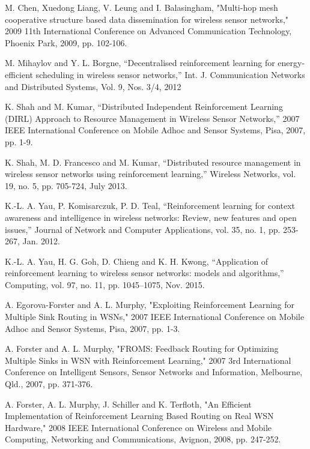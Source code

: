 \documentclass[journal]{IEEEtran}
\begin{document}
\begin{thebibliography}{1}
M. Chen, Xuedong Liang, V. Leung and I. Balasingham, "Multi-hop mesh cooperative structure based data dissemination for wireless sensor networks," 2009 11th International Conference on Advanced Communication Technology, Phoenix Park, 2009, pp. 102-106.

M. Mihaylov and Y. L. Borgne, ``Decentralised reinforcement learning for energy-efficient scheduling in wireless sensor networks,'' Int. J. Communication Networks and Distributed Systems, Vol. 9, Nos. 3/4, 2012

K. Shah and M. Kumar, ``Distributed Independent Reinforcement Learning (DIRL) Approach to Resource Management in Wireless Sensor Networks,'' 2007 IEEE International Conference on Mobile Adhoc and Sensor Systems, Pisa, 2007, pp. 1-9.

K. Shah, M. D. Francesco and M. Kumar, ``Distributed resource management in wireless sensor networks using reinforcement learning,'' Wireless Networks,
vol. 19, no. 5, pp. 705-724, July 2013.

K.-L. A. Yau, P. Komisarczuk, P. D. Teal, ``Reinforcement learning for context awareness and intelligence in wireless
networks: Review, new features and open issues,'' Journal of Network and Computer Applications, vol. 35, no. 1, pp. 253-267, Jan. 2012.

K.-L. A. Yau, H. G. Goh, D. Chieng and K. H. Kwong, ``Application of reinforcement learning to wireless sensor networks: models and algorithms,'' Computing, vol. 97, no. 11, pp. 1045–1075, Nov. 2015.

A. Egorova-Forster and A. L. Murphy, "Exploiting Reinforcement Learning for Multiple Sink Routing in WSNs," 2007 IEEE International Conference on Mobile Adhoc and Sensor Systems, Pisa, 2007, pp. 1-3.

A. Forster and A. L. Murphy, "FROMS: Feedback Routing for Optimizing Multiple Sinks in WSN with Reinforcement Learning," 2007 3rd International Conference on Intelligent Sensors, Sensor Networks and Information, Melbourne, Qld., 2007, pp. 371-376.

A. Forster, A. L. Murphy, J. Schiller and K. Terfloth, "An Efficient Implementation of Reinforcement Learning Based Routing on Real WSN Hardware," 2008 IEEE International Conference on Wireless and Mobile Computing, Networking and Communications, Avignon, 2008, pp. 247-252.


\end{thebibliography}
\end{document}
